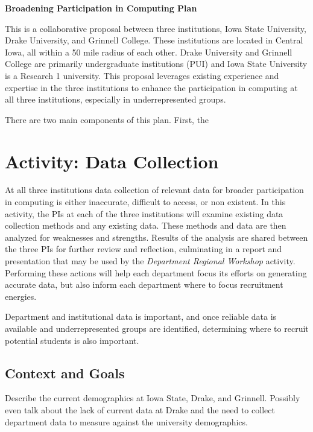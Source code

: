 \documentclass[11pt]{article}
\begin{document}
    \setcounter{page}{1}
    \begin{center}
        {\Large {\bf Broadening Participation in Computing Plan}}
    \end{center}

	This is a collaborative proposal between three institutions, Iowa State University, Drake University, and Grinnell College.  These institutions are located in Central Iowa, all within a 50 mile radius of each other.  Drake University and Grinnell College are primarily undergraduate institutions (PUI) and Iowa State University is a Research 1 university.  This proposal leverages existing experience and expertise in the three institutions to enhance the participation in computing at all three institutions, especially in underrepresented groups.

    There are two main components of this plan.  First, the 
    

    \section{Activity: Data Collection}
    At all three institutions data collection of relevant data for broader participation in computing is either inaccurate, difficult to access, or non existent.
    In this activity, the PIs at each of the three institutions will examine existing data collection methods and any existing data.
    These methods and data are then analyzed for weaknesses and strengths.  Results of the analysis are shared between the three PIs for further review and reflection, culminating in a report and presentation that may be used by the {\it Department Regional Workshop} activity.
    Performing these actions will help each department focus its efforts on generating accurate data, but also inform each department where to focus recruitment energies.
    
    Department and institutional data is important, and once reliable data is available and underrepresented groups are identified, determining where to recruit potential students is also important.
    
    
    
    

    \subsection{Context and Goals}
    Describe the current demographics at Iowa State, Drake, and Grinnell.
    Possibly even talk about the lack of current data at Drake and the need to collect department data to measure against the university demographics.
\end{document}

